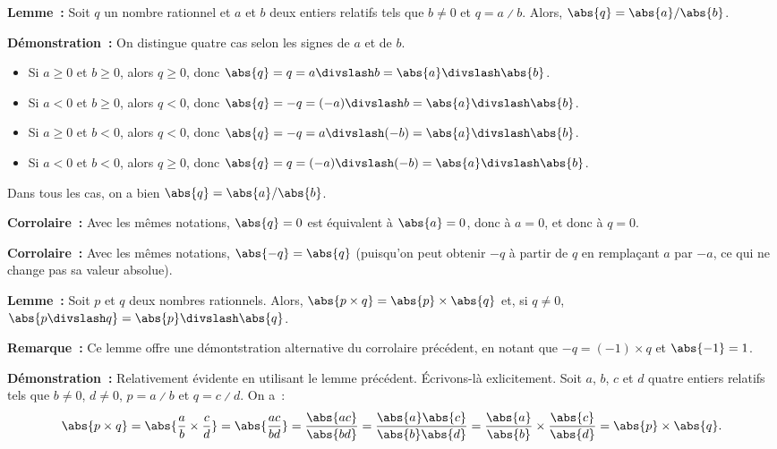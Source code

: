     \done

\medskip

\noindent\textbf{Lemme :} Soit $q$ un nombre rationnel et $a$ et $b$ deux entiers relatifs tels que $b \neq 0$ et $q = a \divslash b$.
    Alors, $\abs{q} = \abs{a} / \abs{b}$.

\medskip

\noindent\textbf{Démonstration :} On distingue quatre cas selon les signes de $a$ et de $b$.
    \begin{itemize}[nosep]
        \item Si $a \geq 0$ et $b \geq 0$, alors $q \geq 0$, donc $\abs{q} = q = a \divslash b = \abs{a} \divslash \abs{b}$.
        \item Si $a < 0$ et $b \geq 0$, alors $q < 0$, donc $\abs{q} = - q = (-a) \divslash b = \abs{a} \divslash \abs{b}$.
        \item Si $a \geq 0$ et $b < 0$, alors $q < 0$, donc $\abs{q} = - q = a \divslash (-b) = \abs{a} \divslash \abs{b}$.
        \item Si $a < 0$ et $b < 0$, alors $q \geq 0$, donc $\abs{q} = q = (-a) \divslash (-b) = \abs{a} \divslash \abs{b}$.
    \end{itemize}
    Dans tous les cas, on a bien $\abs{q} = \abs{a} / \abs{b}$.

    \done

\medskip

\noindent\textbf{Corrolaire :} Avec les mêmes notations, $\abs{q} = 0$ est équivalent à $\abs{a} = 0$, donc à $a = 0$, et donc à $q = 0$.

\medskip

\noindent\textbf{Corrolaire :} Avec les mêmes notations, $\abs{-q} = \abs{q}$ (puisqu'on peut obtenir $-q$ à partir de $q$ en remplaçant $a$ par $-a$, ce qui ne change pas sa valeur absolue).

\medskip

\noindent\textbf{Lemme :} Soit $p$ et $q$ deux nombres rationnels.
    Alors, $\abs{p \times q} = \abs{p} \times \abs{q}$ et, si $q \neq 0$, $\abs{p \divslash q} = \abs{p} \divslash \abs{q}$.

\medskip

\noindent\textbf{Remarque :} Ce lemme offre une démontstration alternative du corrolaire précédent, en notant que $-q = (-1) \times q$ et $\abs{-1} = 1$.

\medskip

\noindent\textbf{Démonstration :} Relativement évidente en utilisant le lemme précédent. 
    Écrivons-là exlicitement.
    Soit $a$, $b$, $c$ et $d$ quatre entiers relatifs tels que $b \neq 0$, $d \neq 0$, $p = a \divslash b$ et $q = c \divslash d$.
    On a : 
    \begin{equation*}
        \abs{p \times q} 
        = \abs{\frac{a}{b} \times \frac{c}{d}}
        = \abs{\frac{a c}{b d}}
        = \frac{\abs{a c}}{\abs{b d}}
        = \frac{\abs{a} \abs{c}}{\abs{b} \abs{d}}
        = \frac{\abs{a}}{\abs{b}} \times \frac{\abs{c}}{\abs{d}}
        = \abs{p} \times \abs{q} .
    \end{equation*}

